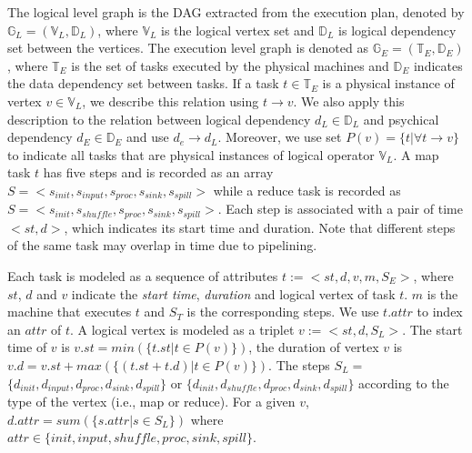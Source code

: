 The logical level graph is the DAG extracted from the execution plan, denoted by $\mathbb{G}_L = (\mathbb{V}_L, \mathbb{D}_L)$, where $\mathbb{V}_L$ is the logical vertex set and $\mathbb{D}_L$ is logical dependency set between the vertices. The execution level graph is denoted as $\mathbb{G}_E = (\mathbb{T}_E, \mathbb{D}_E)$, where $\mathbb{T}_E$ is the set of tasks executed by the physical machines and $\mathbb{D}_E$ indicates the data dependency set between tasks. 
If a task $t \in \mathbb{T}_E$ is a physical instance of vertex $v \in \mathbb{V}_L$, we describe this relation using $t \to v$. We also apply this description to the relation between logical dependency $d_L \in \mathbb{D}_L$ and psychical dependency $d_E \in \mathbb{D}_E$ and use $d_e \to d_L$. Moreover, we use set $P(v) = \{t|\forall t \to v\}$ to indicate all tasks that are physical instances of logical operator $\mathbb{V}_L$. 
A map task $t$ has five steps and is recorded as an array $S=<s_{init}, s_{input}, s_{proc}, s_{sink}, s_{spill}>$ while a reduce task is recorded as $S=<s_{init}, s_{shuffle}, s_{proc}, s_{sink}, s_{spill}>$. Each step is associated with a pair of time $<st, d>$, which indicates its start time and duration. Note that different steps of the same task may overlap in time due to pipelining.

Each task is modeled as a sequence of attributes $t:=<st, d, v, m, S_E>$, where $st$, $d$ and $v$ indicate the \textit{start time}, \textit{duration} and logical vertex of task $t$.  $m$ is the machine that executes $t$ and $S_T$ is the corresponding steps. We use $t.attr$ to index an $attr$ of $t$. A logical vertex is modeled as a triplet $v:=<st, d, S_L>$. The start time of $v$ is $v.st=min(\{t.st|t \in P(v)\})$, the duration of vertex $v$ is $v.d=v.st+max(\{(t.st+t.d)|t \in P(v) \})$. The steps $S_L=$ $\{d_{init}, d_{input}, d_{proc}, d_{sink}, d_{spill}\}$ or $\{d_{init}, d_{shuffle}, d_{proc}, d_{sink}, d_{spill}\}$ according to the type of the vertex (i.e., map or reduce). For a given $v$, $d.attr = sum(\{s.attr| s\in S_L\})$ where $attr \in \{init, input, shuffle, proc, sink, spill\}$. 